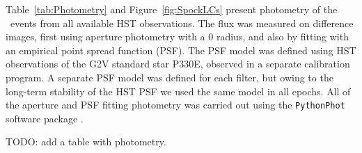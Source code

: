 Table~\ref{tab:Photometry} and Figure~\ref{fig:SpockLCs} present 
photometry of the \spock\ events
from all available HST observations. The flux was measured on
difference images, first using aperture photometry with a 0
radius, and also by fitting with an empirical point spread function
(PSF).  The PSF model was defined using HST observations of the G2V
standard star P330E, observed in a separate calibration program.  A
separate PSF model was defined for each filter, but owing to the
long-term stability of the HST PSF we used the same model in all
epochs.  All of the aperture and PSF fitting photometry was carried
out using the {\tt PythonPhot} software package \citep{Jones:2015}.

TODO: add a table with photometry.




  
  

  
  
  
  
  
  
  
  
  

  
  